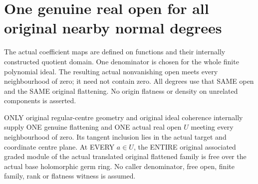 \section{One genuine real open for all original nearby normal degrees}

The actual coefficient maps are defined on functions and their internally
constructed quotient domain. One denominator is chosen for the whole finite
polynomial ideal. The resulting actual nonvanishing open meets every
neighbourhood of zero; it need not contain zero. All degrees use that SAME
open and the SAME original flattening. No origin flatness or density on
unrelated components is asserted.

\begin{theorem}
\label{hir:real-domain-original-nearby-associated-free-open}
\leanok
ONLY original regular-centre geometry and original ideal coherence internally
supply ONE genuine flattening and ONE actual real open $U$ meeting every
neighbourhood of zero. Its tangent inclusion lies in the actual target and
coordinate centre plane. At EVERY $a\in U$, the ENTIRE original associated
graded module of the actual translated original flattened family is free over
the actual base holomorphic germ ring. No caller denominator, free open,
finite family, rank or flatness witness is assumed.
\end{theorem}
